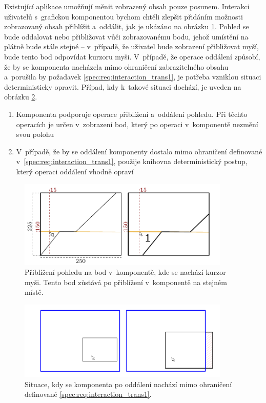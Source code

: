 \pagebreak
Existující aplikace umožňují měnit zobrazený obsah pouze posunem. Interakci uživatelů s~grafickou komponentou bychom chtěli zlepšit přidáním možnosti zobrazovaný obsah přiblížit a~oddálit, jak je ukázáno na obrázku \ref{fig:spec:zoom}. Pohled se bude oddalovat nebo přibližovat vůči zobrazovanému bodu, jehož umístění na plátně bude stále stejné -- v~případě, že uživatel bude zobrazení přibližovat myší, bude tento bod odpovídat kurzoru myši. V~případě, že operace oddálení způsobí, že by se komponenta nacházela mimo ohraničení zabrazitelného obsahu a~porušila by požadavek \ref{spec:req:interaction_trans1}, je potřeba vzniklou situaci deterministicky opravit. Případ, kdy k~takové situaci dochází, je uveden na obrázku \ref{fig:spec:zoom_out_of_bounds}.
\pagebreak
\begin{enumerate}[label=\color{reqcolor}\textbf{R{\arabic*}},resume]
	\item \label{spec:req:interaction_zoom1} Komponenta podporuje operace přiblížení a~oddálení pohledu. Při těchto operacích je určen v~zobrazení bod, který po operaci v~komponentě nezmění svou polohu
	\item \label{spec:req:interaction_zoom2} V~případě, že by se oddálení komponenty dostalo mimo ohraničení definované v~\ref{spec:req:interaction_trans1}, použije knihovna deterministický postup, který operaci oddálení vhodně opraví
\end{enumerate}

\begin{figure}[!htb]
	\centering
	\includegraphics[width=0.9\textwidth]{../img/kap2_scale_example}
	\caption{Přiblížení pohledu na bod v~komponentě, kde se nachází kurzor myši. Tento bod zůstává po přiblížení v~komponentě na stejném místě.}
	\label{fig:spec:zoom}
\end{figure}

\begin{figure}[!htb]
	\centering
	\includegraphics[width=0.9\textwidth]{../img/kap2_scale_example_out_of_bounds}
	\caption{Situace, kdy se komponenta po oddálení nachází mimo ohraničení definované \ref{spec:req:interaction_trans1}.}
	\label{fig:spec:zoom_out_of_bounds}
\end{figure}

